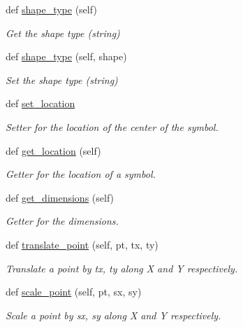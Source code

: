 \begin{DoxyCompactItemize}
def \hyperlink{classbridges_1_1symbol_1_1_symbol_a86813f0f1a7ecbe5c52725730c887e75}{shape\+\_\+type} (self)
\begin{DoxyCompactList}\small\item\em Get the shape type (string) \end{DoxyCompactList}\item 
def \hyperlink{classbridges_1_1symbol_1_1_symbol_aea966b54a55c137ec15e849829fc9be9}{shape\+\_\+type} (self, shape)
\begin{DoxyCompactList}\small\item\em Set the shape type (string) \end{DoxyCompactList}\item 
def \hyperlink{classbridges_1_1symbol_1_1_symbol_a616aeca9f529ed61300e92e63cbbaf99}{set\+\_\+location}
\begin{DoxyCompactList}\small\item\em Setter for the location of the center of the symbol. \end{DoxyCompactList}\item 
def \hyperlink{classbridges_1_1symbol_1_1_symbol_a8abbc9a5c77eb7e2ef40338102a145c4}{get\+\_\+location} (self)
\begin{DoxyCompactList}\small\item\em Getter for the location of a symbol. \end{DoxyCompactList}\item 
def \hyperlink{classbridges_1_1symbol_1_1_symbol_ae53057317f11148bbbf7c17c671cac2d}{get\+\_\+dimensions} (self)
\begin{DoxyCompactList}\small\item\em Getter for the dimensions. \end{DoxyCompactList}\item 
def \hyperlink{classbridges_1_1symbol_1_1_symbol_a9600a66f48ad38baf42a2043db13334b}{translate\+\_\+point} (self, pt, tx, ty)
\begin{DoxyCompactList}\small\item\em Translate a point by tx, ty along X and Y respectively. \end{DoxyCompactList}\item 
def \hyperlink{classbridges_1_1symbol_1_1_symbol_a963b55370096aa7314b03a2a34da2929}{scale\+\_\+point} (self, pt, sx, sy)
\begin{DoxyCompactList}\small\item\em Scale a point by sx, sy along X and Y respectively. \end{DoxyCompactList}\item 

\end{DoxyCompactItemize}
